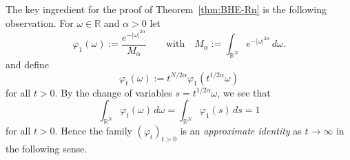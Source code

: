 \documentclass[a4paper, reqno,titlepage]{amsart}
\numberwithin{equation}{section}
\theoremstyle{plain}
\theoremstyle{definition}
\theoremstyle{remark}
\newcommand{\RR}{\mathbb{R}}
\begin{document}
The key ingredient for the proof of Theorem~\ref{thm:BHE-Rn} is the following observation. For $\omega\in\RR$ and $\alpha>0$ let
\begin{equation*}
  \varphi_1(\omega):=\frac{e^{-|\omega|^{2\alpha}}}{M_\alpha}
  \qquad\text{with}\quad
  M_\alpha:=\int_{\RR^N}e^{-|\omega|^{2\alpha}}\,d\omega.
\end{equation*}
and define
\begin{equation}
  \label{eq:approx-id}
  \varphi_t(\omega):=t^{N/2\alpha}\varphi_1(t^{1/2\alpha}\omega)
\end{equation}
for all $t>0$. By the change of variables $s = t^{1/2\alpha}\omega$, we see that
\begin{equation*}
  \int_{\RR^N} \varphi_t(\omega) \,d\omega
  = \int_{\RR^N} \varphi_1(s) \,ds
  = 1
\end{equation*}
for all $t>0$. Hence the family $(\varphi_t)_{t>0}$ is an \emph{approximate identity} as $t \to \infty$ in the following sense.
\end{document}
